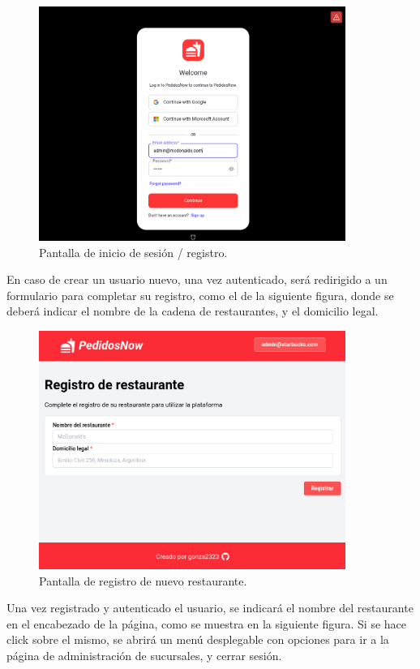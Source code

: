 \begin{figure}[H]
    \centering
    \includegraphics[width=10cm]{./img/login.png}
    \caption{Pantalla de inicio de sesión / registro.}
\end{figure}

En caso de crear un usuario nuevo, una vez autenticado, será redirigido a un formulario para completar su registro, como el de la siguiente figura, donde se deberá indicar el nombre de la cadena de restaurantes, y el domicilio legal.

\begin{figure}[H]
    \centering
    \includegraphics[width=10cm]{./img/login-form.png}
    \caption{Pantalla de registro de nuevo restaurante.}
\end{figure}

Una vez registrado y autenticado el usuario, se indicará el nombre del restaurante en el encabezado de la página, como se muestra en la siguiente figura. Si se hace click sobre el mismo, se abrirá un menú desplegable con opciones para ir a la página de administración de sucursales, y cerrar sesión.


